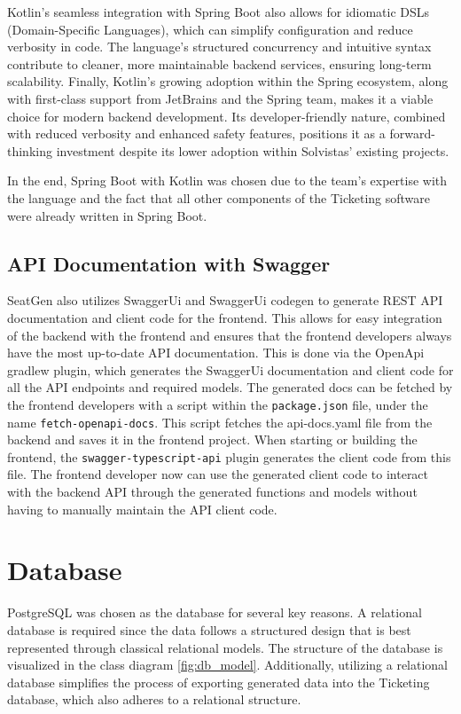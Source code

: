 Kotlin’s seamless integration with Spring Boot also allows for idiomatic DSLs (Domain-Specific Languages), which can simplify configuration and reduce verbosity in code. The language’s structured concurrency and intuitive syntax contribute to cleaner, more maintainable backend services, ensuring long-term scalability. Finally, Kotlin’s growing adoption within the Spring ecosystem, along with first-class support from JetBrains and the Spring team, makes it a viable choice for modern backend development. Its developer-friendly nature, combined with reduced verbosity and enhanced safety features, positions it as a forward-thinking investment despite its lower adoption within Solvistas' existing projects.

In the end, Spring Boot with Kotlin was chosen due to the team's expertise with the language and the fact that all other components of the Ticketing software were already written in Spring Boot.

\subsection{API Documentation with Swagger}
SeatGen also utilizes SwaggerUi and SwaggerUi codegen to generate REST API documentation and client code for the frontend. This allows for easy integration of the backend with the frontend and ensures that the frontend developers always have the most up-to-date API documentation. This is done via the OpenApi gradlew plugin, which generates the SwaggerUi documentation and client code for all the API endpoints and required models. The generated docs can be fetched by the frontend developers with a script within the \texttt{package.json} file, under the name \texttt{fetch-openapi-docs}. This script fetches the api-docs.yaml file from the backend and saves it in the frontend project. When starting or building the frontend, the \texttt{swagger-typescript-api} plugin generates the client code from this file. The frontend developer now can use the generated client code to interact with the backend API through the generated functions and models without having to manually maintain the API client code.


\section{Database}
PostgreSQL was chosen as the database for several key reasons. A relational database is required since the data follows a structured design that is best represented through classical relational models. The structure of the database is visualized in the class diagram \ref{fig:db_model}. Additionally, utilizing a relational database simplifies the process of exporting generated data into the Ticketing database, which also adheres to a relational structure.

